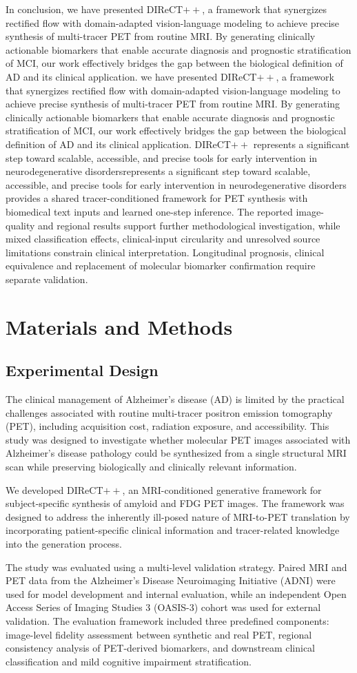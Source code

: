 \documentclass{article}
\providecommand{\DIFaddtex}[1]{{\protect\color{blue} \sf #1}} %
\providecommand{\DIFdeltex}[1]{{\protect\color{red} \ifmmode #1\else\scriptsize #1\fi}} %
\providecommand{\DIFaddbegin}{} %
\providecommand{\DIFaddend}{} %
\providecommand{\DIFdelbegin}{} %
\providecommand{\DIFdelend}{} %
\providecommand{\DIFadd}[1]{\texorpdfstring{\DIFaddtex{#1}}{#1}} %
\providecommand{\DIFdel}[1]{\texorpdfstring{\DIFdeltex{#1}}{}} %
\newcommand{\DIFscaledelfig}{0.5}
\newlength{\DIFdelgraphicswidth} %
\newlength{\DIFdelgraphicsheight} %
\newcommand{\DIFaddincludegraphics}[2][]{{\color{blue}\fbox{\DIFOincludegraphics[#1]{#2}}}} %
\newcommand{\DIFdelincludegraphics}[2][]{%
\sbox{\DIFdelgraphicsbox}{\DIFOincludegraphics[#1]{#2}}%
\settoboxwidth{\DIFdelgraphicswidth}{\DIFdelgraphicsbox} %
\settoboxtotalheight{\DIFdelgraphicsheight}{\DIFdelgraphicsbox} %
\scalebox{\DIFscaledelfig}{%
\parbox[b]{\DIFdelgraphicswidth}{\usebox{\DIFdelgraphicsbox}\\[-\baselineskip] \rule{\DIFdelgraphicswidth}{0em}}\llap{\resizebox{\DIFdelgraphicswidth}{\DIFdelgraphicsheight}{%
\setlength{\unitlength}{\DIFdelgraphicswidth}%
\begin{picture}(1,1)%
\thicklines\linethickness{2pt} %
{\color[rgb]{1,0,0}\put(0,0){\framebox(1,1){}}}%
{\color[rgb]{1,0,0}\put(0,0){\line( 1,1){1}}}%
{\color[rgb]{1,0,0}\put(0,1){\line(1,-1){1}}}%
\end{picture}%
}\hspace*{3pt}}} %
} %
\DeclareRobustCommand{\DIFaddbegin}{\DIFOaddbegin \let\includegraphics\DIFaddincludegraphics} %
\DeclareRobustCommand{\DIFaddend}{\DIFOaddend \let\includegraphics\DIFOincludegraphics} %
\DeclareRobustCommand{\DIFdelbegin}{\DIFOdelbegin \let\includegraphics\DIFdelincludegraphics} %
\DeclareRobustCommand{\DIFdelend}{\DIFOaddend \let\includegraphics\DIFOincludegraphics} %
\begin{document}
In conclusion, \DIFdelbegin \DIFdel{we have presented DIReCT$++$, a framework that synergizes rectified flow with domain-adapted vision-language modeling to achieve precise synthesis of multi-tracer PET from routine MRI. By generating clinically actionable biomarkers that enable accurate diagnosis and prognostic stratification of MCI, our work effectively bridges the gap between the biological definition of AD and its clinical application. }\DIFdelend DIReCT$++$ \DIFdelbegin \DIFdel{represents a significant step toward scalable, accessible, and precise tools for early intervention in neurodegenerative disorders}\DIFdelend \DIFaddbegin \DIFadd{provides a shared tracer-conditioned framework for PET synthesis with biomedical text inputs and learned one-step inference. The reported image-quality and regional results support further methodological investigation, while mixed classification effects, clinical-input circularity and unresolved source limitations constrain clinical interpretation. Longitudinal prognosis, clinical equivalence and replacement of molecular biomarker confirmation require separate validation}\DIFaddend .



\section{Materials and Methods}
\subsection{Experimental Design}

The clinical management of Alzheimer's disease (AD) is limited by the
practical challenges associated with routine multi-tracer positron emission
tomography (PET), including acquisition cost, radiation exposure, and
accessibility. This study was designed to investigate whether molecular PET
images associated with Alzheimer's disease pathology could be synthesized
from a single structural MRI scan while preserving biologically and
clinically relevant information.

We developed DIReCT$++$, an MRI-conditioned generative framework for
subject-specific synthesis of amyloid and FDG PET images. The framework was
designed to address the inherently ill-posed nature of MRI-to-PET translation
by incorporating patient-specific clinical information and tracer-related
knowledge into the generation process.

The study was evaluated using a multi-level validation strategy. Paired MRI
and PET data from the Alzheimer's Disease Neuroimaging Initiative (ADNI) were
used for model development and internal evaluation, while an independent
Open Access Series of Imaging Studies 3 (OASIS-3) cohort was used for
external validation. The evaluation framework included three predefined
components: image-level fidelity assessment between synthetic and real PET,
regional consistency analysis of PET-derived biomarkers, and downstream
clinical classification and mild cognitive impairment stratification.
\end{document}
